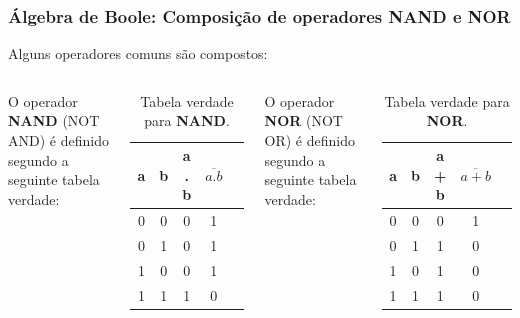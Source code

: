 \begin{frame}
	\frametitle{Álgebra de Boole: Composição de operadores NAND e NOR}
	\begin{center}
		Alguns operadores comuns são compostos: 
	\end{center}
	\begin{columns}
		
			\par O operador \textbf{NAND} (NOT AND) é definido segundo a seguinte tabela verdade:
		
			\begin{table}[h!]
				\centering
				\begin{tabular}{|c|c|c|c|c|}
					\hline
					a & b & a . b & $\overline{a . b}$ \\ \hline
					0 & 0 & 0     & 1  \\ \hline
					0 & 1 & 0     & 1  \\ \hline
					1 & 0 & 0     & 1  \\ \hline
					1 & 1 & 1     & 0  \\ \hline
				\end{tabular}
				\caption{Tabela verdade para \textbf{NAND}.}
				\label{tab:tabelaVerdadeNAND}
			\end{table}
		
			\par O operador \textbf{NOR} (NOT OR) é definido segundo a seguinte tabela verdade:
			\begin{table}[h!]
				\centering
				\begin{tabular}{|c|c|c|c|c|}
					\hline
					a & b & a + b & $\overline{a + b}$ \\ \hline
					0 & 0 & 0     & 1  \\ \hline
					0 & 1 & 1     & 0  \\ \hline
					1 & 0 & 1     & 0  \\ \hline
					1 & 1 & 1     & 0  \\ \hline
				\end{tabular}
				\caption{Tabela verdade para \textbf{NOR}.}
				\label{tab:tabelaVerdadeNOR}
			\end{table}
	\end{columns}
\end{frame}

